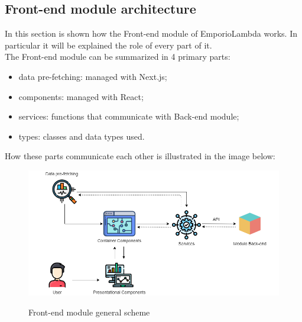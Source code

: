 \subsection{Front-end module architecture}
In this section is shown how the Front-end module of EmporioLambda works. In particular it will be explained the role of every part of it.\\The Front-end module can be summarized in 4 primary parts:
\begin{itemize}
\item data pre-fetching: managed with Next.js;
\item components: managed with React;
\item services: functions that communicate with Back-end module;
\item types: classes and data types used.
\end{itemize} 
How these parts communicate each other is illustrated in the image below:
\begin{figure}[H]
\centering
\includegraphics[scale=0.58]{res/Architettura/Frontend/img/general_frontend}\\
\caption{Front-end module general scheme}
\end{figure}


